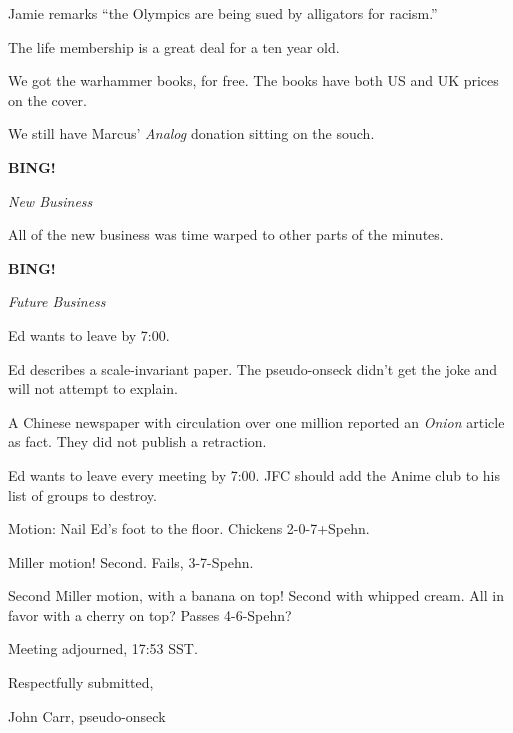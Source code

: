 \documentclass[12pt]{article}
\newcommand{\bing}{{\bf BING!} }
\newcommand{\goto}[1]{\bing \vskip 12pt \centerline{{\em{#1}}}}
\begin{document}
Jamie remarks ``the Olympics are being sued by alligators for racism.''

The life membership is a great deal for a ten year old.

We got the warhammer books, for free.  The books have both US and UK
prices on the cover.

We still have Marcus' {\em Analog} donation sitting on the souch.

\goto{New Business}

\vspace{12pt}

All of the new business was time warped to other parts of the minutes.

\goto{Future Business}

\vspace{12pt}

Ed wants to leave by 7:00.

Ed describes a scale-invariant paper.  The pseudo-onseck didn't get
the joke and will not attempt to explain.

A Chinese newspaper with circulation over one million reported an {\em
Onion} article as fact.  They did not publish a retraction.

Ed wants to leave every meeting by 7:00.  JFC should add the Anime
club to his list of groups to destroy.

Motion: Nail Ed's foot to the floor.  Chickens \hbox{2-0-7+Spehn}.

Miller motion!  Second.  Fails, \hbox{3-7-Spehn}.

Second Miller motion, with a banana on top!  Second with whipped
cream.  All in favor with a cherry on top?  Passes \hbox{4-6-Spehn}?

\noindent
Meeting adjourned, 17:53 SST.

\vspace{18pt}

\centerline{Respectfully submitted,}
\centerline{John Carr, pseudo-onseck}
\end{document}

